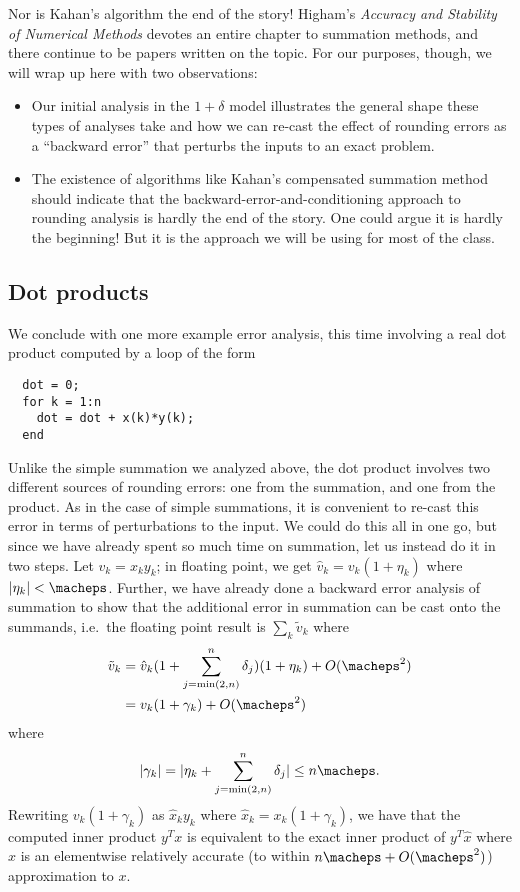 Nor is Kahan's algorithm the end of the story!
Higham's {\em Accuracy and Stability of Numerical Methods}
devotes an entire chapter to summation methods, and there
continue to be papers written on the topic.  For our purposes,
though, we will wrap up here with two observations:
\begin{itemize}
\item Our initial analysis in the $1+\delta$ model illustrates the
  general shape these types of analyses take and how we can re-cast
  the effect of rounding errors as a ``backward error'' that perturbs
  the inputs to an exact problem.
\item The existence of algorithms like Kahan's compensated summation
  method should indicate that the backward-error-and-conditioning
  approach to rounding analysis is hardly the end of the story.
  One could argue it is hardly the beginning!  But it is the approach
  we will be using for most of the class.
\end{itemize}

\subsection{Dot products}

We conclude with one more example error analysis, this time involving
a real dot product computed by a loop of the form
\begin{lstlisting}
  dot = 0;
  for k = 1:n
    dot = dot + x(k)*y(k);
  end
\end{lstlisting}
Unlike the simple summation we analyzed above, the dot product involves
two different sources of rounding errors: one from the summation,
and one from the product.  As in the case of simple summations, it is
convenient to re-cast this error in terms of perturbations to the input.
We could do this all in one go, but since we have already spent so much
time on summation, let us instead do it in two steps.  Let $v_k = x_k y_k$;
in floating point, we get $\hat{v}_k = v_k (1+\eta_k)$
where $|\eta_k| < \macheps$.  Further,
we have already done a backward error analysis of summation to show
that the additional error in summation can be cast onto the summands,
i.e.~the floating point result is $\sum_k \tilde{v}_k$ where
\begin{align*}
  \tilde{v}_k
  &= \hat{v}_k (1 + \sum_{j=\min(2,n)}^n \delta_j) (1 + \eta_k) + O(\macheps^2) \\
  &= v_k (1+\gamma_k) + O(\macheps^2)
\end{align*}
where
\[
  |\gamma_k| = |\eta_k + \sum_{j=\min(2,n)}^n \delta_j| \leq n \macheps.
\]
Rewriting $v_k(1+\gamma_k)$ as $\hat{x}_k y_k$ where
$\hat{x}_k = x_k (1+\gamma_k)$, we have that the computed inner
product $y^T x$ is equivalent to the exact inner product of $y^T \hat{x}$
where $\hat{x}$ is an elementwise relatively accurate
(to within $n \macheps + O(\macheps^2)$) approximation to $x$.

